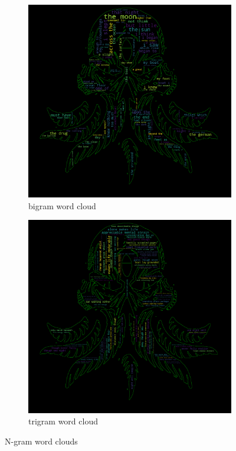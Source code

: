 \documentclass{scrartcl}
\begin{document}
  \begin{figure}[ht]
    \centering
    \begin{subfigure}[b]{0.49\textwidth}
      \centering
      \includegraphics[width=\textwidth]{./figures/wordcloud_2N.png}
      \caption{bigram word cloud}
      \label{fig:bigram}
    \end{subfigure}
    \hfill
    \begin{subfigure}[b]{0.49\textwidth}
      \centering
      \includegraphics[width=\textwidth]{./figures/wordcloud_3N.png}
      \caption{trigram word cloud}
      \label{fig:trigram}
    \end{subfigure}
    \caption{N-gram word clouds}
    \label{fig:N_gram}
  \end{figure}
\end{document}
